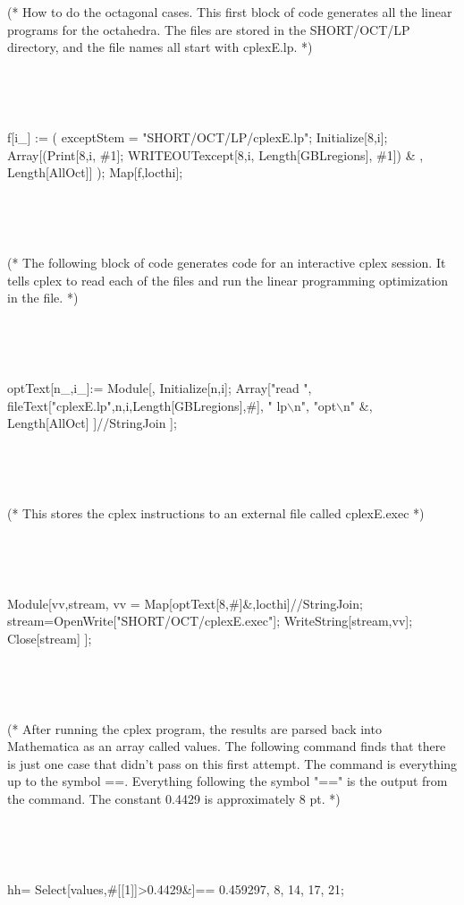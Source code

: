 \bigskip

{\obeylines\tt

(* How to do the octagonal cases.  This first block of code
generates all the linear programs for the octahedra.  The files
are stored in the SHORT/OCT/LP directory, and the file names all
start with cplexE.lp.  *) \

\

\

f[i\_] := (
        exceptStem = "SHORT/OCT/LP/cplexE.lp";
        Initialize[8,i];
        Array[(Print[{8,i, \#1}];
        WRITEOUTexcept[8,i, Length[GBLregions], \#1]) \& , Length[AllOct]]
        );
Map[f,locthi];

\

\

(* The following block of code generates code for an interactive
cplex session.  It tells cplex to read each of the files and run
the linear programming optimization in the file. *)

\

\

optText[n\_,i\_]:= Module[{},
Initialize[n,i];
        Array[{"read ",
            fileText["cplexE.lp",n,i,Length[GBLregions],\#], " lp$\backslash$n",
            "opt$\backslash$n"
            }\&, Length[AllOct]
            ]//StringJoin
        ];

\

\

(* This stores the cplex instructions to an external file called
cplexE.exec *)

\

\

Module[{vv,stream},
    vv = Map[optText[8,\#]\&,locthi]//StringJoin;
    stream=OpenWrite["SHORT/OCT/cplexE.exec"];
    WriteString[stream,vv];
    Close[stream]
    ];

\

\


(* After running the cplex program, the results are parsed back
into Mathematica as an array called values.  The following command
finds that there is just one case that didn't pass on this first
attempt.  The command is everything up to the symbol ==.
Everything following the symbol "==" is the output from the
command.  The constant 0.4429 is approximately 8 pt.  *)

\

\

hh= Select[values,\#[[1]]>0.4429\&]== {{0.459297, 8, 14, 17, 21}};

\

}
